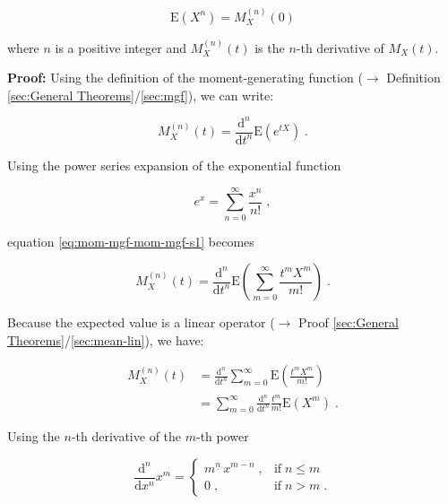 \documentclass[a4paper,12pt,twoside]{book}
\begin{document}
\begin{equation} \label{eq:mom-mgf-mom-mgf}
\mathrm{E}(X^n) = M_X^{(n)}(0)
\end{equation}

where $n$ is a positive integer and $M_X^{(n)}(t)$ is the $n$-th derivative of $M_X(t)$.


\vspace{1em}
\textbf{Proof:} Using the definition of the moment-generating function ($\rightarrow$ Definition \ref{sec:General Theorems}/\ref{sec:mgf}), we can write:

\begin{equation} \label{eq:mom-mgf-mom-mgf-s1}
M_X^{(n)}(t) = \frac{\mathrm{d}^n}{\mathrm{d}t^n} \mathrm{E}(e^{tX}) \; .
\end{equation}

Using the power series expansion of the exponential function

\begin{equation} \label{eq:mom-mgf-exp-ps}
e^x = \sum_{n=0}^\infty \frac{x^n}{n!} \; ,
\end{equation}

equation \eqref{eq:mom-mgf-mom-mgf-s1} becomes

\begin{equation} \label{eq:mom-mgf-mom-mgf-s2}
M_X^{(n)}(t) = \frac{\mathrm{d}^n}{\mathrm{d}t^n} \mathrm{E}\left( \sum_{m=0}^\infty \frac{t^m X^m}{m!} \right) \; .
\end{equation}

Because the expected value is a linear operator ($\rightarrow$ Proof \ref{sec:General Theorems}/\ref{sec:mean-lin}), we have:

\begin{equation} \label{eq:mom-mgf-mom-mgf-s3}
\begin{split}
M_X^{(n)}(t) &= \frac{\mathrm{d}^n}{\mathrm{d}t^n} \sum_{m=0}^\infty \mathrm{E}\left( \frac{t^m X^m}{m!} \right) \\
&= \sum_{m=0}^\infty \frac{\mathrm{d}^n}{\mathrm{d}t^n} \frac{t^m}{m!} \mathrm{E}\left( X^m \right) \; .
\end{split}
\end{equation}

Using the $n$-th derivative of the $m$-th power

\begin{equation} \label{eq:mom-mgf-dndx-xm}
\frac{\mathrm{d}^n}{\mathrm{d}x^n} x^m = \left\{
\begin{array}{rl}
m^{\underline{n}} \, x^{m-n} \; , & \text{if} \; n \leq m \\
0 \; , & \text{if} \; n > m \; .
\end{array}
\right.
\end{equation}
\end{document}
